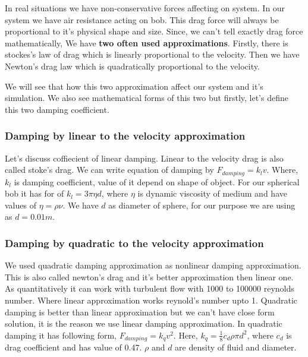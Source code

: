 \documentclass[11pt,a4paper]{article}
\begin{document}
In real situations we have non-conservative forces affecting on system. In our system we have air resistance acting on bob. This drag force will always be proportional to it's physical shape and size. Since, we can't tell exactly drag force mathematically, We have \textbf{two often used approximations}. Firstly, there is stockes's law of drag which is linearly proportional to the velocity. Then we have Newton's drag law which is quadratically proportional to the velocity.

We will see that how this two approximation affect our system and it's simulation. We also see mathematical forms of this two but firstly, let's define this two damping coefficient.

\subsubsection{Damping by linear to the velocity approximation}
\label{sec:org4ee7b6f}

Let's discuss coffiecient of linear damping. Linear to the velocity drag is also called stoke's drag. We can write equation of damping by \(F_{damping} = k_{l}v\). Where, \(k_{l}\) is damping coefficient, value of it depend on shape of object. For our spherical bob it has for of \(k_{l} = 3\pi\eta d\), where \(\eta\) is dynamic viscosity of medium and have values of \(\eta = \rho \nu\). We have \(d\) as diameter of sphere, for our purpose we are using as \(d=0.01m\). 

\subsubsection{Damping by quadratic to the velocity approximation}
\label{sec:org0e5a0dc}

We used quadratic damping approximation as nonlinear damping approximation. This is also called newton's drag and it's better approximation then linear one. As quantitatively it can work with turbulent flow with 1000 to 100000 reynolds number. Where linear approximation works reynold's number upto 1. Quadratic damping is better than linear approximation but we can't have close form solution, it is the reason we use linear damping approximation. In quadratic damping it has following form, \(F_{damping} = k_{q} v^{2}\). Here, \(k_{q} = \frac{1}{8}c_{d}\rho \pi d^{2}\), where \(c_{d}\) is drag coefficient and has value of 0.47. \(\rho\) and \(d\) are density of fluid and diameter.\cite{lubarda2021analysis}\cite{goossens2019review}
\end{document}
